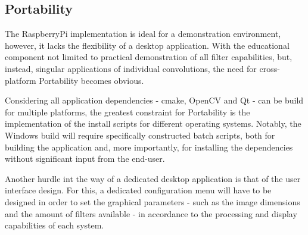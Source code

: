 \subsection{Portability}

The RaspberryPi implementation is ideal for a demonstration environment, however, it lacks the flexibility
of a desktop application. With the educational component not limited to practical demonstration of all 
filter capabilities, but, instead, singular applications of individual convolutions, the need for 
cross-platform Portability becomes obvious.

Considering all application dependencies - cmake, OpenCV and Qt - can be build for multiple platforms,
the greatest constraint for Portability is the implementation of the install scripts for different operating
systems. Notably, the Windows build will require specifically constructed batch scripts, both for 
building the application and, more importantly, for installing the dependencies without significant input
from the end-user.

Another hurdle int the way of a dedicated desktop application is that of the user interface design. For this, 
a dedicated configuration menu will have to be designed in order to set the graphical parameters - such as
the image dimensions and the amount of filters available - in accordance to the processing and display 
capabilities of each system.
